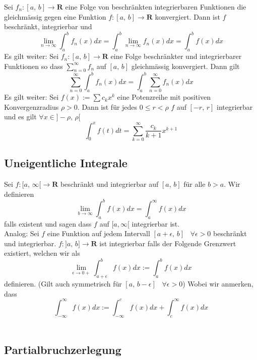 \documentclass[8pt]{article}
\begin{document}
\begin{multicols*}{3}
Sei $f_n:[a,\,b] \rightarrow \mathbf{R}$ eine Folge von beschränkten integrierbaren
Funktionen die gleichmässig gegen eine Funktion $f:[a,\,b] \rightarrow \mathbf{R}$ konvergiert.
Dann ist $f$ beschränkt, integrierbar und
$$
  \lim_{n \rightarrow \infty} \int_a^b f_n(x) dx = \int_a^b \lim_{n \rightarrow \infty} f_n(x) dx = \int_a^b f(x) dx
$$
Es gilt weiter: Sei $f_n:[a,\,b] \rightarrow \mathbf{R}$ eine Folge beschränkter und integrierbarer Funktionen so dass $\sum_{n = 0}^\infty f_n$ auf $[a,\,b]$
gleichmässig konvergiert. Dann gilt
$$
  \sum_{n = 0}^\infty \int_a^b f_n(x) dx = \int_a^b \sum_{n = 0}^\infty f_n(x) dx
$$
Es gilt weiter: Sei $f(x) := \sum c_k x^k$ eine Potenzreihe mit positiven Konvergenzradius $\rho > 0$.
Dann ist für jedes $0 \leq r < \rho$ $f$ auf $[-r,\,r]$ integrierbar und es gilt $\forall x \in ]-\rho,\,\rho[$
$$
  \int_0^x f(t) dt = \sum_{k = 0}^\infty \frac{c_k}{k+1} x^{k+1}
$$
%
%

\subsection{Uneigentliche Integrale}

Sei $f:[a,\,\infty[ \rightarrow \mathbf{R}$ beschränkt und integrierbar auf $[a,\,b]$ für alle $b > a$. Wir definieren
$$
  \lim_{b \rightarrow \infty} \int_a^b f(x) dx = \int_a^\infty f(x) dx
$$
falls existent und sagen dass $f$ auf $[a, \infty[$ integrierbar ist.\\
Analog: Sei $f$ eine Funktion auf jedem Intervall $[a+\epsilon,\,b]\;\;\;\forall \epsilon > 0$
beschränkt und integrierbar. $f:]a,\,b] \rightarrow \mathbf{R}$ ist integrierbar falls der Folgende Grenzwert existiert, welchen wir als
$$
  \lim_{\epsilon \rightarrow 0+} \int_{a + \epsilon}^b f(x) dx := \int_a^b f(x) dx
$$
definieren. (Gilt auch symmetrisch für $[a,\,b-\epsilon]\;\;\;\forall \epsilon > 0$)
Wobei wir anmerken, dass $$\int_{-\infty}^\infty f(x) dx := \int_{-\infty}^c f(x) dx + \int_c^\infty f(x) dx$$
\\

\subsection{Partialbruchzerlegung}


\end{multicols*}
\end{document}

